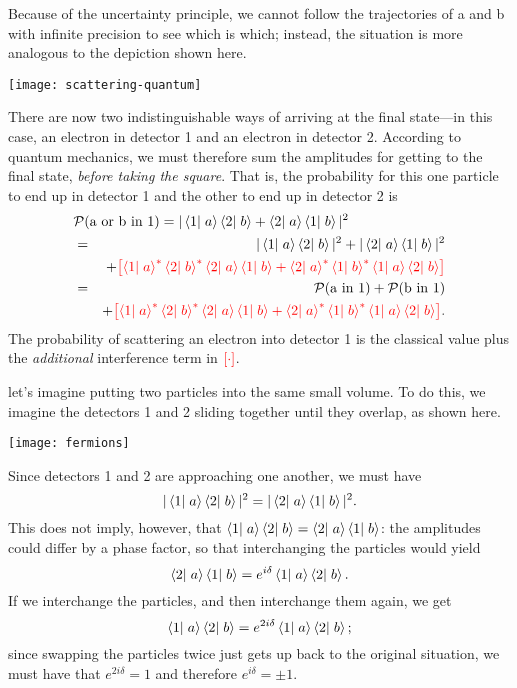 \begin{sidebar}
Because of the uncertainty principle, we cannot follow the trajectories of a and b with infinite precision to see which is which; instead, the situation is more analogous to the depiction shown here.
\begin{center}
\texttt{[image: scattering-quantum]}
\end{center}
There are now two indistinguishable ways of arriving at the final state---in this case, an electron in detector 1 and an electron in detector 2. According to quantum mechanics, we must therefore sum the amplitudes for getting to the final state, \emph{before taking the square}. That is, the probability for this one particle to end up in detector 1 and the other to end up in detector 2 is
\begin{eqnarray}
    \lefteqn{\mathcal{P}(\textrm{a or b in 1}) = |\braket{1}{a}\braket{2}{b} + \braket{2}{a}\braket{1}{b}|^2} && \label{e.scattering-quantum}\\
    &=& |\braket{1}{a}\braket{2}{b}|^2 + |\braket{2}{a}\braket{1}{b}|^2 \nonumber\\
    && + {\color{red}\left[ \braket{1}{a}^*\braket{2}{b}^*\braket{2}{a}\braket{1}{b} + \braket{2}{a}^*\braket{1}{b}^*\braket{1}{a}\braket{2}{b}\right]} \nonumber\\
    &=& \mathcal{P}(\textrm{a in 1}) + \mathcal{P}(\textrm{b in 1}) \nonumber\\
    && + {\color{red}\left[ \braket{1}{a}^*\braket{2}{b}^*\braket{2}{a}\braket{1}{b} + \braket{2}{a}^*\braket{1}{b}^*\braket{1}{a}\braket{2}{b}\right]}. \nonumber
\end{eqnarray}
The probability of scattering an electron into detector 1 is the classical value plus the \emph{additional} interference term in $\color{red}[\cdot]$.

 let's imagine putting two particles into the same small volume.  To do this, we imagine the detectors 1 and 2 sliding together until they overlap, as shown here.  
\begin{center}
\texttt{[image: fermions]}
\end{center}
Since detectors 1 and 2 are approaching one another, we must have
\begin{equation}
    |\left\langle1\right|\left.a\right\rangle\left\langle2\right|\left.b\right\rangle|^2 = |\left\langle2\right|\left.a\right\rangle\left\langle1\right|\left.b\right\rangle|^2.
\end{equation}
This does not imply, however, that $\left\langle1\right|\left.a\right\rangle\left\langle2\right|\left.b\right\rangle = \left\langle2\right|\left.a\right\rangle\left\langle1\right|\left.b\right\rangle$: the amplitudes could differ by a phase factor, so that interchanging the particles would yield
\[
    \left\langle2\right|\left.a\right\rangle\left\langle1\right|\left.b\right\rangle = e^{i\delta}\left\langle1\right|\left.a\right\rangle\left\langle2\right|\left.b\right\rangle.
\]
If we interchange the particles, and then interchange them again, we get
\[
    \left\langle1\right|\left.a\right\rangle\left\langle2\right|\left.b\right\rangle = e^{2i\delta}\left\langle1\right|\left.a\right\rangle\left\langle2\right|\left.b\right\rangle;
\]
since swapping the particles twice just gets up back to the original situation, we must have that $e^{2i\delta} = 1$ and therefore $e^{i\delta} = \pm 1$.


\end{sidebar}
